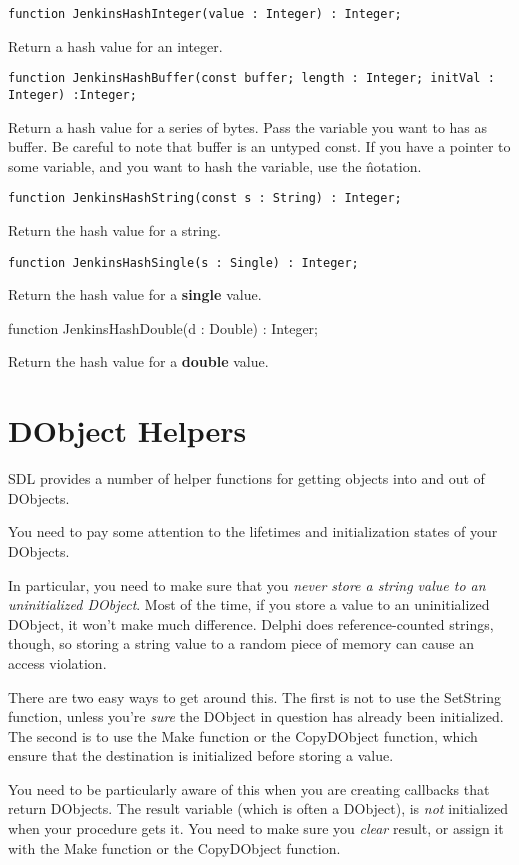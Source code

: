 \documentclass{report}
\begin{document}
\lstinline|function JenkinsHashInteger(value : Integer) : Integer;|

Return a hash value for an integer.

\begin{lstlisting}
function JenkinsHashBuffer(const buffer; length : Integer; initVal : Integer) :Integer;
\end{lstlisting}

Return a hash value for a series of bytes. Pass the variable you want to has
as buffer. Be careful to note that buffer is an untyped const. If you have a
pointer to some variable, and you want to hash the variable, use the \^ notation.

\lstinline|function JenkinsHashString(const s : String) : Integer;|

Return the hash value for a string.

\lstinline|function JenkinsHashSingle(s : Single) : Integer;|

Return the hash value for a \textbf{ single} value.

function JenkinsHashDouble(d : Double) : Integer;

Return the hash value for a \textbf{ double} value.

\section{DObject Helpers}

SDL provides a number of helper functions for getting 
objects into and out of DObjects.

You need to pay some attention to the lifetimes and initialization 
states of your DObjects.

In particular, you need to make sure that you \emph{never store a string
value to an uninitialized DObject}. Most of the time, if you store a value
to an uninitialized DObject, it won't make much difference. Delphi does
reference-counted strings, though, so storing a string value to a random
piece of memory can cause an access violation.

There are two easy ways to get around this. The first is not to use the
SetString function, unless you're \emph{sure} the DObject in question has
already been initialized.  The second is to use the Make function or the
CopyDObject function, which ensure that the destination is initialized
before storing a value.

You need to be particularly aware of this when you are creating callbacks
that return DObjects. The result variable (which is often a DObject), is
\emph{not} initialized when your procedure gets it. You need to make sure
you \emph{clear} result, or assign it with the Make function or the
CopyDObject function.
\end{document}
